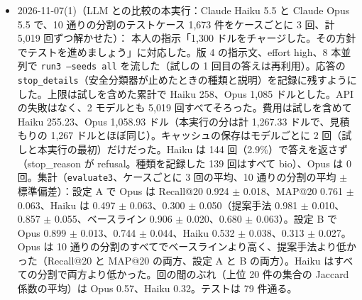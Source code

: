 \documentclass[11pt,a4paper]{jsarticle}
\begin{document}
\begin{itemize}[nosep]
    本人の指示「Opus が提案手法を上回ったケースの特徴を調べて」に対応した。既存の出力には正解式の順位しかないため、\texttt{dump\_proposed\_top20.py} で提案手法を同じ設定・同じ乱数で学習し直し、テストケースごとの上位 20 件を書き出した（設定 A・B の各 10 通りの分割。順位は既存の出力と全ケースで一致）。\texttt{analyze\_opus\_vs\_proposed.py} で、ケースごとに Opus（3 回の平均）と提案手法（テストに入る分割の平均）を比べた（\texttt{experiments/llm\_db\_baseline/opus\_vs\_proposed.json}）。設定 A の 1,586 件で、Recall@20 が上回ったのは 36 件（すべて合成のケース。3 回とも全分割より高いのは 12 件）、MAP@20 は 274 件（単一出典 10、出典横断 65、合成 199）。Recall@20 で上回った 36 件は、正解式が多いケース（7 本以上が 26 件）で、25 件は同じ教科書が別々の出典として DB に 2 回以上入っているもの（Seborg の 2 つの PDF、Process Control の 3 つの PDF と 1 章）から作られていた。正解式が 7 本以上の合成のケースで上回った割合は、その教科書から作られたケースで 26\%、ほかで 4\%（設定 B でも 29\%、5\%）。ただしその教科書のケースでは Opus が下回った割合も 70\% で、両方の Recall@20 が下がる（提案手法 0.75、Opus 0.65）。上回ったケースでは、提案手法の上位 20 件に、正解式と同じ式の別の出典の写し（1 件あたり 3.9 本）と、変数がすべて入出力に含まれる不正解の式（9.2 本）が並び、Opus だけが上位 20 件に入れた正解式（58 本）は、入出力との変数の重なりが小さく（Jaccard 0.17）、説明文との文章類似度も低かった（0.07）。出典横断のケースでは、変数の重なりが最も小さい正解式の Jaccard が下位 3 分の 1 のときに MAP@20 で上回る割合が 20\%（ほかは 6〜8\%）で、Opus の MAP@20 は重なりによらずほぼ一定（0.78、0.77、0.77）、提案手法は下がる（0.92 → 0.86）。説明文が分野ラベルの語を含むかと、正解式の変数の数には、この差との関係が見られなかった。
  \item 2026-11-07(1)（LLM との比較の本実行：Claude Haiku 5.5 と Claude Opus 5.5 で、10 通りの分割のテストケース 1,673 件をケースごとに 3 回、計 5,019 回ずつ解かせた）：
    本人の指示「1,300 ドルをチャージした。その方針でテストを進めましょう」に対応した。版 4 の指示文、effort high、8 本並列で \texttt{run3 --seeds all} を流した（試しの 1 回目の答えは再利用）。応答の \texttt{stop\_details}（安全分類器が止めたときの種類と説明）を記録に残すようにした。上限は試しを含めた累計で Haiku 258、Opus 1,085 ドルとした。API の失敗はなく、2 モデルとも 5,019 回すべてそろった。費用は試しを含めて Haiku 255.23、Opus 1,058.93 ドル（本実行の分は計 1,267.33 ドルで、見積もりの 1,267 ドルとほぼ同じ）。キャッシュの保存はモデルごとに 2 回（試しと本実行の最初）だけだった。Haiku は 144 回（2.9\%）で答えを返さず（stop\_reason が refusal。種類を記録した 139 回はすべて bio）、Opus は 0 回。集計（\texttt{evaluate3}、ケースごとに 3 回の平均、10 通りの分割の平均 $\pm$ 標準偏差）：設定 A で Opus は Recall@20 0.924 $\pm$ 0.018、MAP@20 0.761 $\pm$ 0.063、Haiku は 0.497 $\pm$ 0.063、0.300 $\pm$ 0.050（提案手法 0.981 $\pm$ 0.010、0.857 $\pm$ 0.055、ベースライン 0.906 $\pm$ 0.020、0.680 $\pm$ 0.063）。設定 B で Opus 0.899 $\pm$ 0.013、0.744 $\pm$ 0.044、Haiku 0.532 $\pm$ 0.038、0.313 $\pm$ 0.027。Opus は 10 通りの分割のすべてでベースラインより高く、提案手法より低かった（Recall@20 と MAP@20 の両方、設定 A と B の両方）。Haiku はすべての分割で両方より低かった。回の間のぶれ（上位 20 件の集合の Jaccard 係数の平均）は Opus 0.57、Haiku 0.32。テストは 79 件通る。

\end{itemize}
\end{document}
